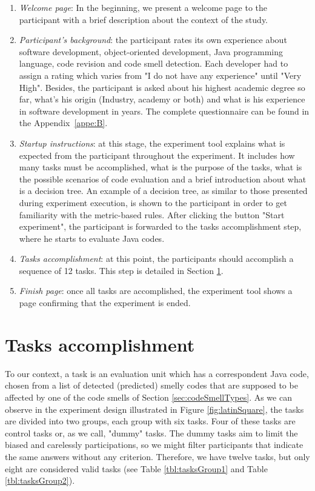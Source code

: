 \begin{enumerate}
    \item \textit{Welcome page}: In the beginning, we present a welcome page to the participant with a brief description about the context of the study.
    
    \item \textit{Participant's background}: the participant rates its own experience about software development, object-oriented development, Java programming language, code revision and code smell detection. Each developer had to assign a rating which varies from "I do not have any experience" until "Very High".  Besides, the participant is asked about his highest academic degree so far, what's his origin (Industry, academy or both) and what is his experience in software development in years. The complete questionnaire can be found in the Appendix~\ref{appe:B}.
    
    \item \textit{Startup instructions}: at this stage, the experiment tool explains what is expected from the participant throughout the experiment. It includes how many tasks must be accomplished, what is the purpose of the tasks, what is the possible scenarios of code evaluation and a brief introduction about what is a decision tree. An example of a decision tree, as similar to those presented during experiment execution,  is shown to the participant in order to get familiarity with the metric-based rules. After clicking the button "Start experiment", the participant is forwarded to the tasks accomplishment step, where he starts to evaluate Java codes.  
    
    \item \textit{Tasks accomplishment}: at this point, the participants should accomplish a sequence of 12 tasks. This step is detailed in Section \ref{sec:tasksAccomplishment}.  
    
    \item \textit{Finish page}: once all tasks are accomplished, the experiment tool shows a page confirming that the experiment is ended.
    
\end{enumerate}

\section{Tasks accomplishment} \label{sec:tasksAccomplishment}

To our context, a task is an evaluation unit which has a correspondent Java code, chosen from a list of detected (predicted) smelly codes that are supposed to be affected by one of the code smells of Section \ref{sec:codeSmellTypes}. As we can observe in the experiment design illustrated in Figure \ref{fig:latinSquare}, the tasks are divided into two groups, each group with six tasks. Four of these tasks are control tasks or, as we call, "dummy" tasks. The dummy tasks aim to limit the biased \cite{palomba2014they} and carelessly participations, so we might filter participants that indicate the same answers without any criterion. Therefore, we have twelve tasks, but only eight are considered valid tasks (see Table \ref{tbl:tasksGroup1} and Table \ref{tbl:tasksGroup2}).

